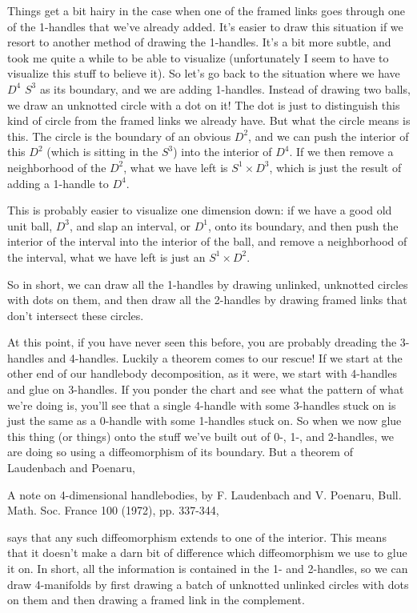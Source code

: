 Things get a bit hairy in the case when one of the framed links goes through one of the 1-handles that we've already added. It's easier to draw this situation if we resort to another method of drawing the 1-handles. It's a bit more subtle, and took me quite a while to be able to visualize (unfortunately I seem to have to visualize this stuff to believe it). So let's go back to the situation where we have $D^4$ $S^3$ as its boundary, and we are adding 1-handles. Instead of drawing two balls, we draw an unknotted circle with a dot on it! The dot is just to distinguish this kind of circle from the framed links we already have. But what the circle means is this. The circle is the boundary of an obvious $D^2$, and we can push the interior of this $D^2$ (which is sitting in the $S^3$) into the interior of $D^4$. If we then remove a neighborhood of the $D^2$, what we have left is $S^1 \times D^3$, which is just the result of adding a 1-handle to $D^4$.

This is probably easier to visualize one dimension down: if we have a good old unit ball, $D^3$, and slap an interval, or $D^1$, onto its boundary, and then push the interior of the interval into the interior of the ball, and remove a neighborhood of the interval, what we have left is just an $S^1 \times D^2$.

So in short, we can draw all the 1-handles by drawing unlinked, unknotted circles with dots on them, and then draw all the 2-handles by drawing framed links that don't intersect these circles.

At this point, if you have never seen this before, you are probably dreading the 3-handles and 4-handles. Luckily a theorem comes to our rescue! If we start at the other end of our handlebody decomposition, as it were, we start with 4-handles and glue on 3-handles. If you ponder the chart and see what the pattern of what we're doing is, you'll see that a single 4-handle with some 3-handles stuck on is just the same as a 0-handle with some 1-handles stuck on. So when we now glue this thing (or things) onto the stuff we've built out of 0-, 1-, and 2-handles, we are doing so using a diffeomorphism of its boundary. But a theorem of Laudenbach and Poenaru,

A note on 4-dimensional handlebodies, by F. Laudenbach and V. Poenaru, Bull. Math. Soc. France 100 (1972), pp. 337-344,

says that any such diffeomorphism extends to one of the interior. This means that it doesn't make a darn bit of difference which diffeomorphism we use to glue it on. In short, all the information is contained in the 1- and 2-handles, so we can draw 4-manifolds by first drawing a batch of unknotted unlinked circles with dots on them and then drawing a framed link in the complement.

